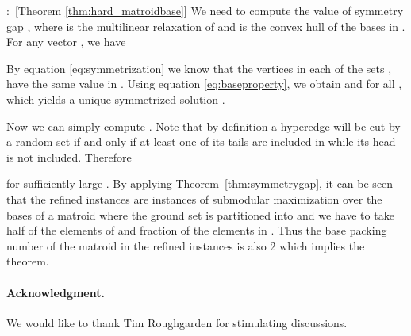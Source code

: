 \documentclass{article}[11pt]
\renewenvironment{proof}{\noindent{\bf Proof}:~}{\\}
\begin{document}
\begin{proof}[Theorem \ref{thm:hard_matroidbase}]
We need to compute the value of symmetry gap , where  is the multilinear relaxation of 
and  is the convex hull of the bases in .
For any vector , we have 

By equation \eqref{eq:symmetrization} we know that the vertices in each of the sets , 
have the same value in . Using equation \eqref{eq:baseproperty},
we obtain  and 
for all ,
which yields a unique symmetrized solution . 

Now we can simply compute . 
Note that by definition a hyperedge will be cut by a random set 
if and only if at least one of its tails are included in  while its head is not included.
Therefore 

for sufficiently large . By applying Theorem~\ref{thm:symmetrygap}, it can be seen
that the refined instances are instances of submodular maximization over the bases
of a matroid where the ground set is partitioned into  and we have to take half
of the elements of  and  fraction of the elements in .
Thus the base packing number of the matroid in the refined instances is also 2
which implies the theorem.
\end{proof}


\paragraph{Acknowledgment.}
We would like to thank Tim Roughgarden for stimulating discussions.
\end{document}
